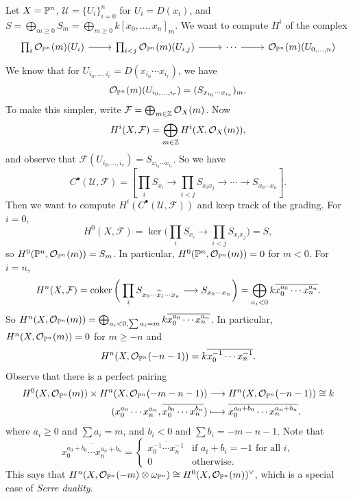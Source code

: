\begin{example}
  Let $X = \mathbb{P}^n$,
  $\mathcal{U} = \{U_i\}_{i = 0}^n$ for
  $U_i = D(x_i)$, and
  $S = \bigoplus_{m \ge 0} S_m = \bigoplus_{m \ge 0} k[x_0, \dots, x_n]_m$.
  We want to compute $H^i$ of the complex
  \[
    \begin{tikzcd}
      \prod_i \OO_{\PP^n}(m)(U_i)
      \ar[r] & \prod_{i < j} \OO_{\PP^n}(m)(U_{i, j})
      \ar[r] & \cdots \ar[r] &
      \OO_{\PP^n}(m)(U_{0, \dots, n})
    \end{tikzcd}
  \]
  We know that for $U_{i_0, \dots, i_r} = D(x_{i_0} \cdots x_{i_r})$,
  we have
  \[
    \mathcal{O}_{\mathbb{P}^n}(m)(U_{i_0, \dots, i_r})
    = (S_{x_{i_0} \cdots x_{i_r}})_m.
  \]
  To make this simpler, write
  $\mathcal{F} = \bigoplus_{m \in \mathbb{Z}} \mathcal{O}_X(m)$.
  Now
  \[
    H^i(X, \mathcal{F})
    = \bigoplus_{m \in \mathbb{Z}} H^i(X, \mathcal{O}_X(m)),
  \]
  and
  observe that $\mathcal{F}(U_{i_0, \dots, i_r}) = S_{x_{i_0} \cdots x_{i_r}}$.
  So we have
  \[
    C^\bullet(\mathcal{U}, \mathcal{F})
    = \left[
      \prod_i S_{x_i}
      \longrightarrow
      \prod_{i < j} S_{x_i x_j}
      \longrightarrow \cdots
      \longrightarrow
      S_{x_0 \cdots x_n}
    \right].
  \]
  Then we want to compute
  $H^i(C^\bullet(\mathcal{U}, \mathcal{F}))$
  and keep track of the grading. For
  $i = 0$,
  \[
    H^0(X, \mathcal{F})
    = \ker\bigg(
      \prod_i S_{x_i} \longrightarrow \prod_{i < j} S_{x_i x_j}\bigg)
      = S,
  \]
  so $H^0(\mathbb{P}^n, \mathcal{O}_{\mathbb{P}^n}(m)) = S_m$.
  In particular,
  $H^0(\mathbb{P}^n, \mathcal{O}_{\mathbb{P}^n}(m)) = 0$ for $m < 0$.
  For $i = n$,
  \[
    H^n(X, \mathcal{F})
    = \operatorname{coker}\bigg(
      \prod_i S_{x_0 \cdots \widehat{x}_i \cdots x_n}
      \longrightarrow
      S_{x_0 \cdots x_n}
    \bigg)
    = \bigoplus_{a_i < 0} k \overline{x_0^{a_0} \cdots x_n^{a_n}}.
  \]
  So $H^n(X, \mathcal{O}_{\mathbb{P}^n}(m)) = \bigoplus_{a_i < 0, \sum a_i = m} k \overline{x_0^{a_0} \cdots x_n^{a_n}}$.
  In particular,
  $H^n(X, \mathcal{O}_{\mathbb{P}^n}(m)) = 0$ for
  $m \ge -n$ and
  \[
    H^n(X, \mathcal{O}_{\mathbb{P}^n}(-n - 1))
    = k \overline{x_0^{-1} \cdots x_n^{-1}}.
  \]
  Observe that there is a perfect pairing
  \begin{align*}
    H^0(X, \mathcal{O}_{\mathbb{P}^n}(m))
    \times H^n(X, \mathcal{O}_{\mathbb{P}^n}(-m - n - 1))
    &\longrightarrow H^n(X, \mathcal{O}_{\mathbb{P}^n}(-n - 1)) \cong k \\
    (x_0^{a_0} \cdots x_n^{a_n}, \overline{x_0^{b_0} \cdots x_n^{b_n}})
    &\longmapsto
    \overline{x_0^{a_0 + b_0} \cdots x_n^{a_n + b_n}}.
  \end{align*}
  where $a_i \ge 0$ and
  $\sum a_i = m$, and
  $b_i < 0$ and $\sum b_i = -m - n - 1$.
  Note that
  \[
    \overline{x_0^{a_0 + b_0} \cdots x_n^{a_n + b_n}}
    =
    \begin{cases}
      \overline{x_0^{-1} \cdots x_n^{-1}} & \text{if } a_i + b_i = -1 \text{ for all } i, \\
      0 & \text{otherwise}.
    \end{cases}
  \]
  This says that
  $H^n(X, \mathcal{O}_{\mathbb{P}^n}(-m) \otimes \omega_{\mathbb{P}^n}) \cong H^0(X, \mathcal{O}_{\mathbb{P}^n}(m))^\vee$,
  which is a special case of \emph{Serre duality}.


\end{example}

